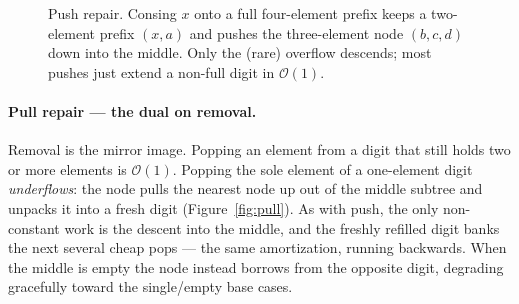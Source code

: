 \documentclass[11pt]{article}
\newcommand{\bigO}{\ensuremath{\mathcal{O}}}
\begin{document}
\begin{figure}[ht]
\centering
{}
\caption{Push repair. Consing $x$ onto a full four-element prefix keeps a two-element prefix $(x,a)$ and
pushes the three-element node $(b,c,d)$ down into the middle. Only the (rare) overflow descends; most
pushes just extend a non-full digit in $\bigO(1)$.}
\label{fig:repair}
\end{figure}

\paragraph{Pull repair --- the dual on removal.}
Removal is the mirror image. Popping an element from a digit that still holds two or more elements is
$\bigO(1)$. Popping the sole element of a one-element digit \emph{underflows}: the node pulls the nearest
node up out of the middle subtree and unpacks it into a fresh digit (Figure~\ref{fig:pull}). As with push,
the only non-constant work is the descent into the middle, and the freshly refilled digit banks the next
several cheap pops --- the same amortization, running backwards. When the middle is empty the node instead
borrows from the opposite digit, degrading gracefully toward the single/empty base cases.
\end{document}
